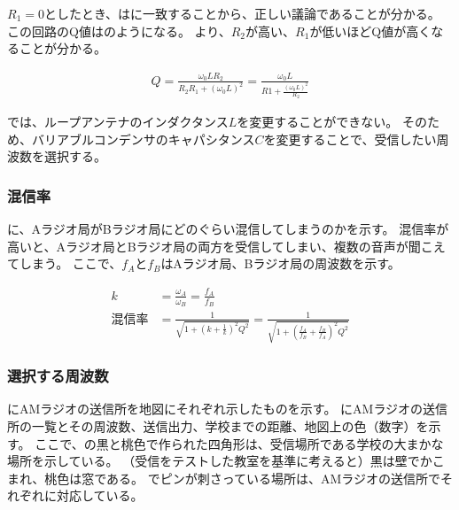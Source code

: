 \documentclass[report.tex]{subfiles}
\begin{document}
$R_1 = 0$としたとき、はに一致することから、正しい議論であることが分かる。
この回路のQ値はのようになる。
より、\(R_2\)が高い、\(R_1\)が低いほどQ値が高くなることが分かる。

\begin{align}
	Q = \frac{\omega_0 L R_2}{R_2R_1 + (\omega_0 L)^2} = \frac{\omega_0 L}{R1 + \frac{(\omega_0 L)^2}{R_2}} \label{eq:Q値2}
\end{align}

では、ループアンテナのインダクタンス\(L\)を変更することができない。
そのため、バリアブルコンデンサのキャパシタンス\(C\)を変更することで、受信したい周波数を選択する。

\subsubsection{混信率}

に、Aラジオ局がBラジオ局にどのぐらい混信してしまうのかを示す。
混信率が高いと、Aラジオ局とBラジオ局の両方を受信してしまい、複数の音声が聞こえてしまう。
ここで、\(f_A\)と\(f_B\)はAラジオ局、Bラジオ局の周波数を示す\cite{ノート}。

\begin{align}
	k   & = \frac{\omega_A}{\omega_B} = \frac{f_A}{f_B} \label{eq:混信率2}                                                                                         \\
	混信率 & = \frac{1}{\sqrt{1 + \left(k + \frac{1}{k}\right)^2 Q^2}} = \frac{1}{\sqrt{1 + \left(\frac{f_A}{f_B} + \frac{f_B}{f_A}\right)^2 Q^2}}  \label{eq:混信率}
\end{align}

\subsubsection{選択する周波数} \label{sec:select}

にAMラジオの送信所を地図にそれぞれ示したものを示す。
にAMラジオの送信所の一覧とその周波数、送信出力、学校までの距離、地図上の色（数字）を示す。
ここで、の黒と桃色で作られた四角形は、受信場所である学校の大まかな場所を示している。
（受信をテストした教室を基準に考えると）黒は壁でかこまれ、桃色は窓である。
でピンが刺さっている場所は、AMラジオの送信所でそれぞれに対応している。
\end{document}
